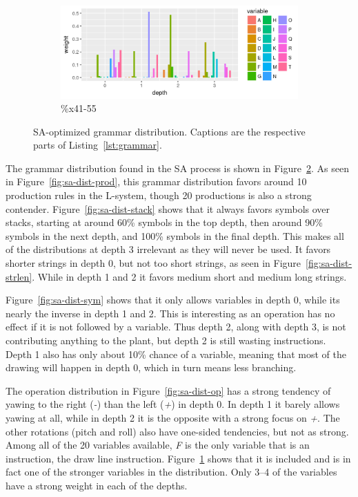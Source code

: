 \begin{figure}
    \ContinuedFloat
    \begin{subfigure}{0.98\textwidth}
        \includegraphics[width=\textwidth]{figures/sa-dist-var}
        \caption{\%x41-55}
        \label{fig:sa-dist-var}
    \end{subfigure}
    \caption[SA-optimized grammar distribution]{SA-optimized grammar distribution. Captions are the respective parts of Listing~\ref{lst:grammar}.}
    \label{fig:sa-dist}
\end{figure}

The grammar distribution found in the SA process is shown in Figure~\ref{fig:sa-dist}.
As seen in Figure~\ref{fig:sa-dist-prod}, this grammar distribution favors around 10 production rules in the L-system, though 20 productions is also a strong contender.
Figure~\ref{fig:sa-dist-stack} shows that it always favors symbols over stacks, starting at around 60\% symbols in the top depth, then around 90\% symbols in the next depth, and 100\% symbols in the final depth.
This makes all of the distributions at depth 3 irrelevant as they will never be used.
It favors shorter strings in depth 0, but not too short strings, as seen in Figure~\ref{fig:sa-dist-strlen}.
While in depth 1 and 2 it favors medium short and medium long strings.

Figure~\ref{fig:sa-dist-sym} shows that it only allows variables in depth 0, while its nearly the inverse in depth 1 and 2.
This is interesting as an operation has no effect if it is not followed by a variable.
Thus depth 2, along with depth 3, is not contributing anything to the plant, but depth 2 is still wasting instructions.
Depth 1 also has only about 10\% chance of a variable, meaning that most of the drawing will happen in depth 0, which in turn means less branching.

The operation distribution in Figure~\ref{fig:sa-dist-op} has a strong tendency of yawing to the right (\textit{-}) than the left (\textit{+}) in depth 0.
In depth 1 it barely allows yawing at all, while in depth 2 it is the opposite with a strong focus on \textit{+}.
The other rotations (pitch and roll) also have one-sided tendencies, but not as strong.
Among all of the 20 variables available, \textit{F} is the only variable that is an instruction, the draw line instruction.
Figure~\ref{fig:sa-dist-var} shows that it is included and is in fact one of the stronger variables in the distribution.
Only 3--4 of the variables have a strong weight in each of the depths.

